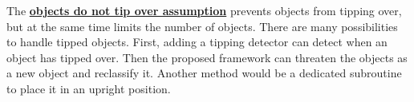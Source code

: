 The \hyperref[assumption:no_tipping]{\textbf{objects do not tip over assumption}} prevents objects from tipping over, but at the same time limits the number of objects. There are many possibilities to handle tipped objects. First, adding a tipping detector can detect when an object has tipped over. Then the proposed framework can threaten the objects as a new object and reclassify it. Another method would be a dedicated subroutine to place it in an upright position.\bs

%
